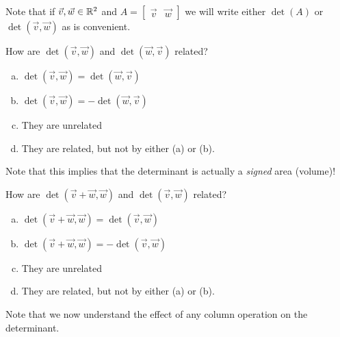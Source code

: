 \begin{applicationActivities}{1}{25}
\begin{observation}
Note that if $\vec{v},\vec{w} \in \mathbb{R}^2$ and $A=\begin{bmatrix} \vec{v} & \vec{w}\end{bmatrix}$ we will write either $\det(A)$ or $\det(\vec{v},\vec{w})$ as is convenient.
\end{observation}

\begin{activity}{5}
How are $\det (\vec{v},\vec{w})$ and $\det(\vec{w},\vec{v})$ related?
\begin{enumerate}[(a)]
\item $\det(\vec{v},\vec{w}) = \det(\vec{w},\vec{v})$
\item $\det(\vec{v},\vec{w}) = -\det(\vec{w},\vec{v})$
\item They are unrelated
\item They are related, but not by either (a) or (b).
\end{enumerate}
\end{activity}


\begin{observation}
Note that this implies that the determinant is actually a \textit{signed} area (volume)!
\end{observation}

\begin{activity}{5}
How are $\det (\vec{v}+\vec{w},\vec{w})$ and $\det(\vec{v},\vec{w})$ related?
\begin{enumerate}[(a)]
\item $\det(\vec{v}+\vec{w},\vec{w}) = \det(\vec{v},\vec{w})$
\item $\det(\vec{v}+\vec{w},\vec{w}) = -\det(\vec{v},\vec{w})$
\item They are unrelated
\item They are related, but not by either (a) or (b).
\end{enumerate}
\end{activity}

\begin{observation}
  Note that we now understand the effect of any column operation on the determinant.
\end{observation}


\end{applicationActivities}
